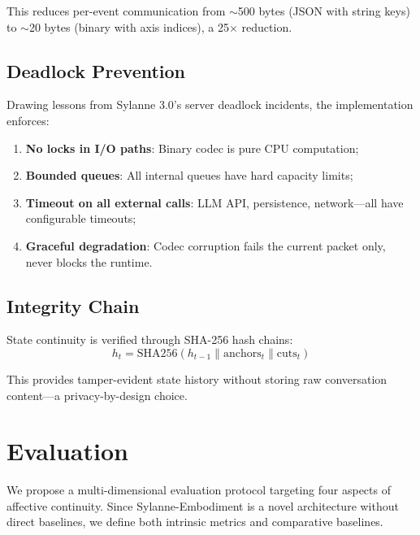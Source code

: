 \documentclass[10pt,twocolumn]{article}
\begin{document}
This reduces per-event communication from $\sim$500 bytes (JSON with string keys) to $\sim$20 bytes (binary with axis indices), a 25$\times$ reduction.

\subsection{Deadlock Prevention}

Drawing lessons from Sylanne 3.0's server deadlock incidents, the implementation enforces:

\begin{enumerate}[nosep,leftmargin=*]
\item \textbf{No locks in I/O paths}: Binary codec is pure CPU computation;
\item \textbf{Bounded queues}: All internal queues have hard capacity limits;
\item \textbf{Timeout on all external calls}: LLM API, persistence, network---all have configurable timeouts;
\item \textbf{Graceful degradation}: Codec corruption fails the current packet only, never blocks the runtime.
\end{enumerate}

\subsection{Integrity Chain}

State continuity is verified through SHA-256 hash chains:
\begin{equation}
h_t = \text{SHA256}(h_{t-1} \| \text{anchors}_t \| \text{cuts}_t)
\end{equation}

This provides tamper-evident state history without storing raw conversation content---a privacy-by-design choice.

\section{Evaluation}
\label{sec:evaluation}

We propose a multi-dimensional evaluation protocol targeting four aspects of affective continuity. Since Sylanne-Embodiment is a novel architecture without direct baselines, we define both intrinsic metrics and comparative baselines.
\end{document}
